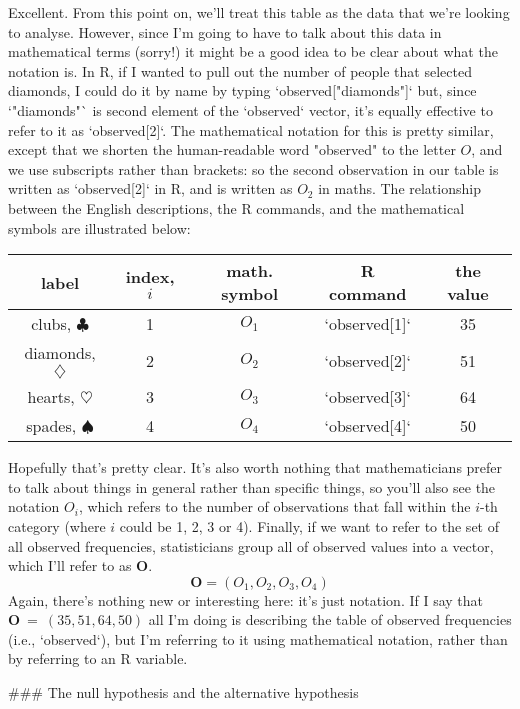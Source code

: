 Excellent. From this point on, we'll treat this table as the data that we're looking to analyse. However, since I'm going to have to talk about this data in mathematical terms (sorry!) it might be a good idea to be clear about what the notation is. In R, if I wanted to pull out the number of people that selected diamonds, I could do it by name by typing `observed["diamonds"]` but, since `"diamonds"` is second element of the `observed` vector, it's equally effective to refer to it as `observed[2]`. The mathematical notation for this is pretty similar, except that we shorten the human-readable word "observed" to the letter $O$, and we use subscripts rather than brackets: so the second observation in our table is written as `observed[2]` in R, and is written as $O_2$ in maths. The relationship between the English descriptions, the R commands, and the mathematical symbols are illustrated below: 

\begin{center}
\begin{tabular}{cc|ccc}
label &  index, $i$  & math. symbol & R command & the value \\  \hline
 clubs, $\clubsuit$ 	& 1 	& $O_1$ & `observed[1]` & 35 \\
 diamonds, $\diamondsuit$ & 2& $O_2$ & `observed[2]`& 51 \\
 hearts, $\heartsuit$	&3	& $O_3$& `observed[3]` & 64 \\
 spades, $\spadesuit$ &4		& $O_4$& `observed[4]` & 50 \\
\end{tabular}
\end{center}


Hopefully that's pretty clear. It's also worth nothing that mathematicians prefer to talk about things in general rather than specific things, so you'll also see the notation $O_i$, which refers to the number of observations that fall within the $i$-th category (where $i$ could be 1, 2, 3 or 4). Finally, if we want to refer to the set of all observed frequencies, statisticians group all of observed values into a vector, which I'll refer to as $\bm{O}$. 
$$
\bm{O} = (O_1, O_2, O_3, O_4)
$$
Again, there's nothing new or interesting here: it's just notation. If I say that $\bm{O}~=~(35, 51, 64, 50)$ all I'm doing is describing the table of observed frequencies (i.e., `observed`), but I'm referring to it using mathematical notation, rather than by referring to an R variable. 


### The null hypothesis and the alternative hypothesis

